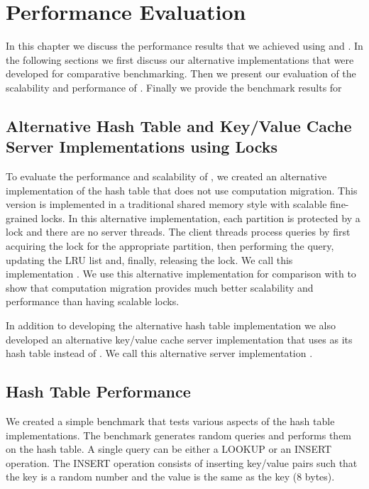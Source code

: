 \chapter{Performance Evaluation}
\label{chap:eval}

In this chapter we discuss the performance results that we achieved using \cphash{} and \cpserver{}. In the following sections we 
first discuss our alternative implementations that were developed for comparative benchmarking. Then we present our evaluation of the scalability 
and performance of \cphash{}. Finally we provide the benchmark results for \cpserver{}

\section{Alternative Hash Table and Key/Value Cache Server Implementations using Locks}

To evaluate the performance and scalability of \cphash{}, we created an alternative implementation
of the hash table that does not use computation migration. This version is implemented in a traditional shared memory 
style with scalable fine-grained locks. In this alternative implementation, each partition is protected by
a lock and there are no server threads. The client threads process queries by first acquiring the lock for
the appropriate partition, then performing the query, updating the LRU list and, finally, releasing the lock. We call this implementation \lockhash{}.
We use this alternative implementation for comparison with \cphash{} to show that computation migration provides much
better scalability and performance than having scalable locks.

In addition to developing the alternative hash table implementation we also developed an alternative key/value cache server implementation
that uses \lockhash{} as its hash table instead of \cphash{}. We call this alternative server implementation \lockserver{}.

\section{Hash Table Performance}

We created a simple benchmark that tests various aspects of the hash table implementations. The benchmark generates random queries and
performs them on the hash table. A single query can be either a LOOKUP or an INSERT operation. The INSERT operation consists of 
inserting key/value pairs such that the key is a random number and the value is the same as the key (8 bytes). 

